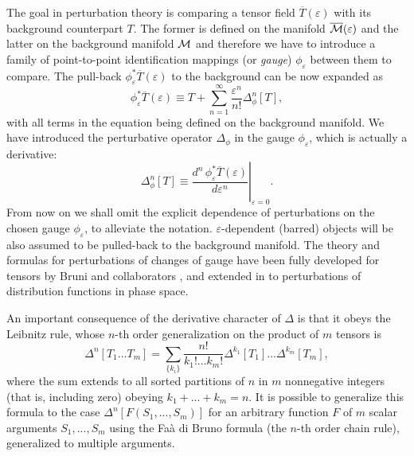 \documentclass[aps,prd,showpacs]{revtex4}
\begin{document}
The goal in perturbation theory is comparing a tensor field
$\overline{T}(\varepsilon)$ with its background counterpart $T$. The former is
defined on the manifold $\overline{\cal M}(\varepsilon)$ and the latter on
the background manifold ${\cal M}$ and therefore we have to introduce a
family of point-to-point identification mappings (or {\em gauge}) $\phi_\varepsilon$
between them to compare. The pull-back $\phi_\varepsilon^*\overline{T}(\varepsilon)$ to
the background can be now expanded as
\begin{equation}
\phi_\varepsilon^*\overline{T}(\varepsilon)\equiv T +
             \sum_{n=1}^{\infty}\frac{\varepsilon^n}{n!}\Delta_\phi^n[T],
\end{equation}
with all terms in the equation being defined on the background manifold.
We have introduced the perturbative operator $\Delta_\phi$ in the gauge
$\phi_\varepsilon$, which is actually a derivative:
\begin{equation}
\Delta_\phi^n[T]\equiv \left.
\frac{d^n \, \phi_\varepsilon^*\overline{T}(\varepsilon)}{d\varepsilon^n}
\right|_{\varepsilon=0}.
\end{equation}
From now on we shall omit the explicit dependence of perturbations on
the chosen gauge $\phi_\varepsilon$, to alleviate the notation. $\varepsilon$-dependent
(barred) objects will be also assumed to be pulled-back to the background
manifold. The theory and formulas for perturbations of changes of gauge
have been fully developed for tensors by Bruni and collaborators
\cite{BMM97}, and extended in \cite{Pit07} to perturbations of
distribution functions in phase space.

An important consequence of the derivative character of $\Delta$ is that
it obeys the Leibnitz rule, whose $n$-th order generalization on the
product of $m$ tensors is
\begin{equation}\label{product} 
\Delta^n[T_1\dots T_m]=\sum_{\{k_i\}} \frac{n!}{k_1!\dots k_m!}\Delta^{k_1}[T_1]\dots\Delta^{k_m}[T_m],
\end{equation}
where the sum extends to all sorted partitions of $n$ in $m$ nonnegative
integers (that is, including zero) obeying $k_1+...+k_m=n$.
It is possible to generalize this formula to the case
$\Delta^n[ F(S_1, ..., S_m) ]$ for an arbitrary function $F$ of $m$
scalar arguments $S_1,..., S_m$ using the
Fa\`a di Bruno formula \cite{AbSt} (the $n$-th order chain rule),
generalized to multiple arguments.
\end{document}
